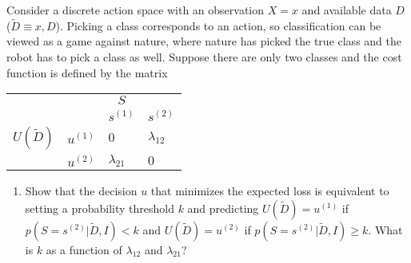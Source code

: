 \begin{example}
	Consider a discrete action space with an observation $X=x$ and available data $D$ ($\tilde{D} \equiv {x, D}$). Picking a class corresponds to an action, so classification can be viewed as a game against nature, where nature has picked the true class and the robot has to pick a class as well. Suppose there are only two classes and the cost function is defined by the matrix
	\begin{center}
		\begin{tabular}{ c  c  c  c }
			&& $S$& \\
			&& $s^{(1)}$ & $s^{(2)}$  \\
			\cline{3-4}
			$U(\tilde{D})$ & $u^{(1)}$& \multicolumn{1}{|l}{$0$} &\multicolumn{1}{l|}{$\lambda_{12}$}  \\
			& $u^{(2)}$& \multicolumn{1}{|l}{$\lambda_{21}$} & \multicolumn{1}{l|}{$0$} \\
			\cline{3-4}
		\end{tabular}
	\end{center}
	\begin{enumerate}
		\item Show that the decision $u$ that minimizes the expected loss is equivalent to setting a probability threshold $k$ and predicting $U(\tilde{D})=u^{(1)}$ if $p(S=s^{(2)}|\tilde{D},I) < k$ and $U(\tilde{D})=u^{(2)}$ if $p(S=s^{(2)}|\tilde{D},I)\geq k$. What is $k$ as a function of $\lambda_{12}$ and $\lambda_{21}$?\newline
		

\end{enumerate}
\end{example}
